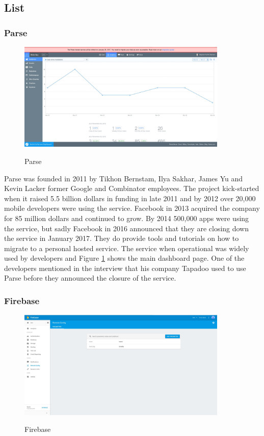 \subsection{List}

\subsubsection{Parse}

\begin{figure}[!h]
    \caption{Parse}
    \centering
    \includegraphics[width=100mm]{images/parse}
    \label{fig:parse}
\end{figure}

Parse \cite{parse} was founded in 2011 by Tikhon Bernstam, Ilya Sakhar, James Yu and Kevin Lacker former Google and Combinator employees. The project kick-started when it raised 5.5 billion dollars in funding in late 2011 and by 2012 over 20,000 mobile developers were using the service. Facebook in 2013 acquired the company for 85 million dollars and continued to grow. By 2014 500,000 apps were using the service, but sadly Facebook in 2016 announced that they are closing down the service in January 2017. They do provide tools and tutorials on how to migrate to a personal hosted service. The service when operational was widely used by developers and Figure \ref{fig:parse} shows the main dashboard page. One of the developers mentioned in the interview that his company Tapadoo used to use Parse before they announced the closure of the service.

\subsubsection{Firebase}

\begin{figure}[!h]
    \caption{Firebase}
    \centering
    \includegraphics[width=100mm]{images/firebase}
    \label{fig:firebase}
\end{figure}


